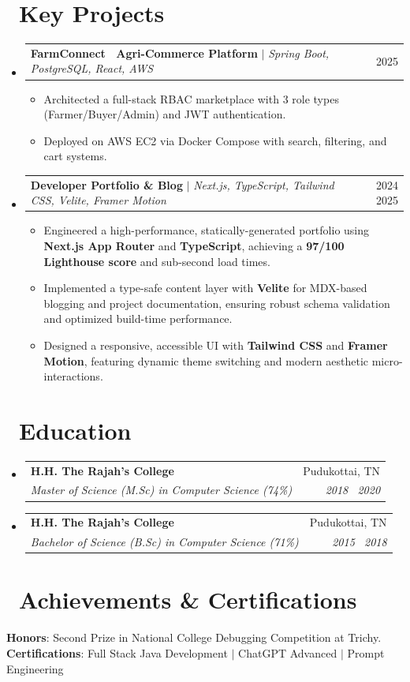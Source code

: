 \documentclass[letterpaper,11pt]{article}
\makeatletter
\newcommand{\resumeItem}[1]{
  \item\small{
    {#1 \vspace{-2pt}}
  }
}
\newcommand{\resumeSubheading}[4]{
  \vspace{-2pt}\item
    \begin{tabular*}{0.97\textwidth}[t]{l@{\extracolsep{\fill}}r}
      \textbf{#1} & #2 \\
      \textit{\small#3} & \textit{\small #4} \\
    \end{tabular*}\vspace{-7pt}
}
\newcommand{\resumeProjectHeading}[2]{
    \item
    \begin{tabular*}{0.97\textwidth}{l@{\extracolsep{\fill}}r}
      \small#1 & #2 \\
    \end{tabular*}\vspace{-7pt}
}
\newcommand{\resumeSubHeadingListStart}{\begin{itemize}[leftmargin=0.15in, label={}]}
\newcommand{\resumeSubHeadingListEnd}{\end{itemize}}
\newcommand{\resumeItemListStart}{\begin{itemize}}
\newcommand{\resumeItemListEnd}{\end{itemize}\vspace{-5pt}}
\makeatother
\begin{document}
\section{\ Key Projects}
    \resumeSubHeadingListStart
      \resumeProjectHeading
          {\textbf{FarmConnect \textendash\ Agri-Commerce Platform} $|$ \emph{Spring Boot, PostgreSQL, React, AWS}}{2025}
          \resumeItemListStart
            \resumeItem{Architected a full-stack RBAC marketplace with 3 role types (Farmer/Buyer/Admin) and JWT authentication.}
            \resumeItem{Deployed on AWS EC2 via Docker Compose with search, filtering, and cart systems.}
          \resumeItemListEnd
      \resumeProjectHeading
          {\textbf{Developer Portfolio \& Blog} $|$ \emph{Next.js, TypeScript, Tailwind CSS, Velite, Framer Motion}}{2024 \textendash\ 2025}
          \resumeItemListStart
            \resumeItem{Engineered a high-performance, statically-generated portfolio using \textbf{Next.js App Router} and \textbf{TypeScript}, achieving a \textbf{97/100 Lighthouse score} and sub-second load times.}
            \resumeItem{Implemented a type-safe content layer with \textbf{Velite} for MDX-based blogging and project documentation, ensuring robust schema validation and optimized build-time performance.}
            \resumeItem{Designed a responsive, accessible UI with \textbf{Tailwind CSS} and \textbf{Framer Motion}, featuring dynamic theme switching and modern aesthetic micro-interactions.}
          \resumeItemListEnd
    \resumeSubHeadingListEnd

\section{\ Education}
  \resumeSubHeadingListStart
    \resumeSubheading
      {H.H. The Rajah's College}{Pudukottai, TN}
      {Master of Science (M.Sc) in Computer Science (74\%)}{2018 \textendash\ 2020}
    \resumeSubheading
      {H.H. The Rajah's College}{Pudukottai, TN}
      {Bachelor of Science (B.Sc) in Computer Science (71\%)}{2015 \textendash\ 2018}
  \resumeSubHeadingListEnd

\section{\ Achievements \& Certifications}
 \begin{itemize}[leftmargin=0.15in, label={}]
    \small{\item{
     \textbf{Honors}{: Second Prize in National College Debugging Competition at Trichy.} \\
     \textbf{Certifications}{: Full Stack Java Development $|$ ChatGPT Advanced $|$ Prompt Engineering}
    }}
 \end{itemize}

\end{document}

